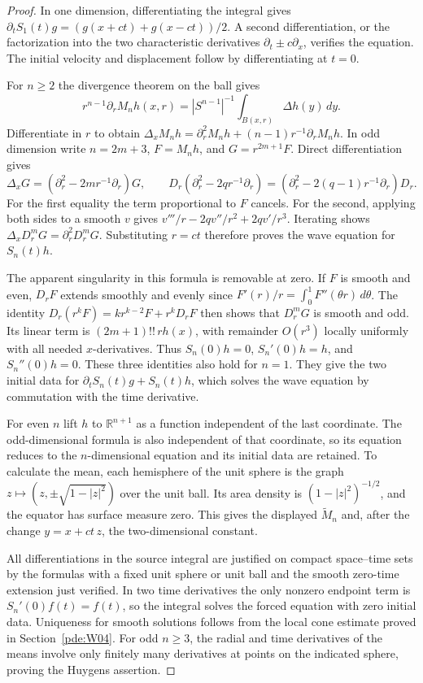 \documentclass[11pt,oneside,openany]{book}
\theoremstyle{plain}
\theoremstyle{definition}
\theoremstyle{remark}
\begin{document}
\begin{proof}
In one dimension, differentiating the integral gives
\(\partial_tS_1(t)g=(g(x+ct)+g(x-ct))/2\).
A second differentiation, or the factorization into the two
characteristic derivatives \(\partial_t\pm c\partial_x\), verifies
the equation. The initial velocity and displacement follow
by differentiating at \(t=0\).

For \(n\geq2\) the divergence theorem on the ball gives
\[
 r^{n-1}\partial_r M_n h(x,r)
   =|S^{n-1}|^{-1}\int_{B(x,r)}\Delta h(y)\,dy .
\]
Differentiate in \(r\) to obtain
\(\Delta_x M_n h=\partial_r^2 M_n h+(n-1)r^{-1}\partial_rM_n h\).
In odd dimension write \(n=2m+3\), \(F=M_n h\), and \(G=r^{2m+1}F\).
Direct differentiation gives
\[
 \Delta_xG=(\partial_r^2-2m r^{-1}\partial_r)G,\qquad
 D_r(\partial_r^2-2q r^{-1}\partial_r)
    =(\partial_r^2-2(q-1)r^{-1}\partial_r)D_r .
\]
For the first equality the term proportional to \(F\) cancels.
For the second, applying both sides to a smooth \(v\) gives
\(v'''/r-2qv''/r^2+2qv'/r^3\). Iterating shows
\(\Delta_xD_r^mG=\partial_r^2D_r^mG\). Substituting \(r=ct\)
therefore proves the wave equation for \(S_n(t)h\).

The apparent singularity in this formula is removable at zero.
If \(F\) is smooth and even, \(D_rF\) extends smoothly and evenly
since \(F'(r)/r=\int_0^1 F''(\theta r)\,d\theta\).
The identity
\(D_r(r^k F)=kr^{k-2}F+r^k D_rF\) then shows that \(D_r^mG\)
is smooth and odd. Its linear term is \((2m+1)!!\,rh(x)\),
with remainder \(O(r^3)\) locally uniformly with all needed
\(x\)-derivatives. Thus \(S_n(0)h=0\), \(S_n'(0)h=h\),
and \(S_n''(0)h=0\). These three identities also hold for \(n=1\).
They give the two initial data for
\(\partial_t S_n(t)g+S_n(t)h\), which solves the wave equation
by commutation with the time derivative.

For even \(n\) lift \(h\) to \(\mathbb R^{n+1}\) as a function
independent of the last coordinate. The odd-dimensional formula is
also independent of that coordinate, so its equation reduces to
the \(n\)-dimensional equation and its initial data are retained.
To calculate the mean, each hemisphere of the unit sphere is
the graph \(z\mapsto (z,\pm\sqrt{1-|z|^2})\) over the unit ball.
Its area density is \((1-|z|^2)^{-1/2}\), and the equator has
surface measure zero. This gives the displayed \(\widetilde M_n\)
and, after the change \(y=x+ct\,z\), the two-dimensional constant.

All differentiations in the source integral are justified on compact
space--time sets by the formulas with a fixed unit sphere or unit
ball and the smooth zero-time extension just verified. In two time
derivatives the only nonzero endpoint term is
\(S_n'(0)f(t)=f(t)\), so the integral solves the forced equation
with zero initial data. Uniqueness for smooth solutions follows
from the local cone estimate proved in Section~\ref{pde:W04}.
For odd \(n\geq3\), the radial and time derivatives of the means
involve only finitely many derivatives at points on the indicated
sphere, proving the Huygens assertion.
\end{proof}
\end{document}
